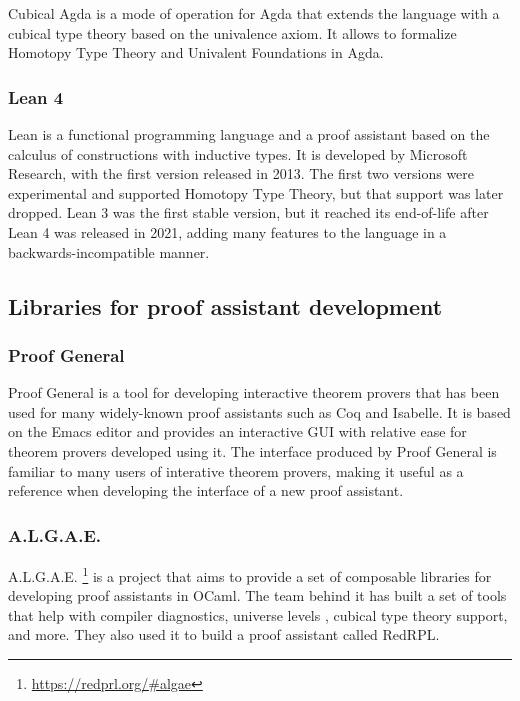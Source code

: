 Cubical Agda \cite{VEZZOSI2021} is a mode of operation for Agda that extends the language with a cubical type theory \cite{Cohen2016} based on the univalence axiom.
It allows to formalize Homotopy Type Theory and Univalent Foundations in Agda.

\subsubsection{Lean 4}

Lean is a functional programming language and a proof assistant based on the calculus of constructions with inductive types.
It is developed by Microsoft Research, with the first version released in 2013.
The first two versions were experimental and supported Homotopy Type Theory, but that support was later dropped.
Lean 3 was the first stable version, but it reached its end-of-life after Lean 4 was released in 2021, adding many features to the language in a backwards-incompatible manner.

\subsection{Libraries for proof assistant development}

\subsubsection{Proof General}

Proof General \cite{Aspinall2000} is a tool for developing interactive theorem
provers that has been used for many widely-known proof assistants such as Coq
and Isabelle.
It is based on the Emacs editor and provides an interactive GUI with relative
ease for theorem provers developed using it.
The interface produced by Proof General is familiar to many users of interative theorem
provers, making it useful as a reference when developing the interface of a new proof assistant.

\subsubsection{A.L.G.A.E.}

A.L.G.A.E. \footnote{\url{https://redprl.org/\#algae}} is a project that aims to provide a set
of composable libraries for developing proof assistants in OCaml.
The team behind it has built a set of tools that help with compiler diagnostics,
universe levels \cite{Kovacs2021}, cubical type theory support, and more.
They also used it to build a proof assistant called RedRPL.

